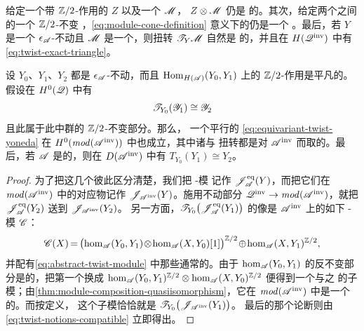 给定一个带 $\mathbb{Z}/2$-作用的\trVectorSpace{}\trChainComplex{} $Z$ 以及一个%
\trEquivariant{}\trModule{} $\mathscr{M}$，\trTensorProduct{} $Z\otimes\mathscr{M}$ 仍是%
\trEquivariant{}的。其次，给定两个\trEquivariant{}\trModule{}之间的一个 $\mathbb{Z}/2$-不变%
\trHomomorphism，\eqref{eq:module-cone-definition} 意义下的\trCone{}仍是一个%
\trEquivariant{}\trModule。最后，若 $Y$ 是一个 $\epsilon_{\mathscr{A}}$-不动\trObject{}且
$\mathscr{M}$ 是一个\trEquivariant{}\trModule，则扭转\trModule{} $\mathscr{T}_Y\mathscr{M}$ 自然是%
\trEquivariant{}的，并且在 $H(\mathscr{Q}^{\mathrm{inv}})$ 中有\trExactTriangle{}
\eqref{eq:twist-exact-triangle}。

\begin{lemma}\label{thm:equivariant-twist-yoneda-invariant}
设 $Y_0$、$Y_1$、$Y_2$ 都是 $\epsilon_{\mathscr{A}}$-不动\trObject，而且
$\operatorname{Hom}_{H(\mathscr{A})}(Y_0,Y_1)$ 上的 $\mathbb{Z}/2$-作用是平凡的。假设在 $H^0(\mathscr{Q})$ 中有
\begin{equation}\label{eq:equivariant-twist-yoneda}
\mathscr{T}_{Y_0}(\mathscr{Y}_1)\cong\mathscr{Y}_2
\end{equation}
且此\trIsomorphism{}属于此\trCategory{}中\trMorphism{}群的 $\mathbb{Z}/2$-不变部分。那么，
一个平行的\trIsomorphism{} \eqref{eq:equivariant-twist-yoneda} 在
$H^0(\mathit{mod}(\mathscr{A}^{\mathrm{inv}}))$ 中也成立，其中诸\trYoneda{}\trModule{}与
扭转都是对 $\mathscr{A}^{\mathrm{inv}}$ 而取的。最后，若 $\mathscr{A}$ 是\trCfinite{}的，则在
$D(\mathscr{A}^{\mathrm{inv}})$ 中有 $T_{Y_0}(Y_1)\cong Y_2$。
\end{lemma}

\begin{proof}
为了把这几个\trCategory{}彼此区分清楚，我们把\trEquivariant{}\trYoneda{} \trAinfty-模
记作 $\mathscr{J}^{\mathrm{eq}}_{\mathscr{A}}(Y)$，而把它们在
$\mathit{mod}(\mathscr{A}^{\mathrm{inv}})$ 中的对应物记作
$\mathscr{J}_{\mathscr{A}^{\mathrm{inv}}}(Y)$。施用不动部分\trFunctor{}%
$\mathscr{Q}^{\mathrm{inv}}\to\mathit{mod}(\mathscr{A}^{\mathrm{inv}})$，就把
$\mathscr{J}^{\mathrm{eq}}_{\mathscr{A}}(Y_2)$ 送到 $\mathscr{J}_{\mathscr{A}^{\mathrm{inv}}}(Y_2)$。
另一方面，$\mathscr{T}_{Y_0}\bigl(\mathscr{J}^{\mathrm{eq}}_{\mathscr{A}}(Y_1)\bigr)$ 的像是
$\mathscr{A}^{\mathrm{inv}}$ 上的如下 \trAinfty-模 $\mathscr{C}$：
\begin{equation*}
\medmuskip=1.5mu\relax\thickmuskip=3mu\relax
\scr{C}(X)=\bigl(\hom_{\scr{A}}(Y_0,Y_1)\otimes\hom_{\scr{A}}(X,Y_0)[1]\bigr)^{\ZZ/2}
\oplus\hom_{\scr{A}}(X,Y_1)^{\ZZ/2},
\end{equation*}
并配有\eqref{eq:abstract-twist-module} 中那些通常的\trStructureMap。由于
$\hom_{\mathscr{A}}(Y_0,Y_1)$ 的反不变部分是\trAcyclic{}的，把第一个\trDirectSummand{}换成
$\hom_{\mathscr{A}}(Y_0,Y_1)^{\mathbb{Z}/2}\otimes\hom_{\mathscr{A}}(X,Y_0)^{\mathbb{Z}/2}$ 便得到一个与之%
\trQuasiisomorphic{}的子模；由\cref{thm:module-composition-quasiisomorphism}，它在
$\mathit{mod}(\mathscr{A}^{\mathrm{inv}})$ 中是一个\trIsomorphic{}的\trObject。而按定义，
这个子模恰恰就是 $\mathscr{T}_{Y_0}\bigl(\mathscr{J}_{\mathscr{A}^{\mathrm{inv}}}(Y_1)\bigr)$。
最后的那个论断则由\eqref{eq:twist-notions-compatible} 立即得出。
\end{proof}

